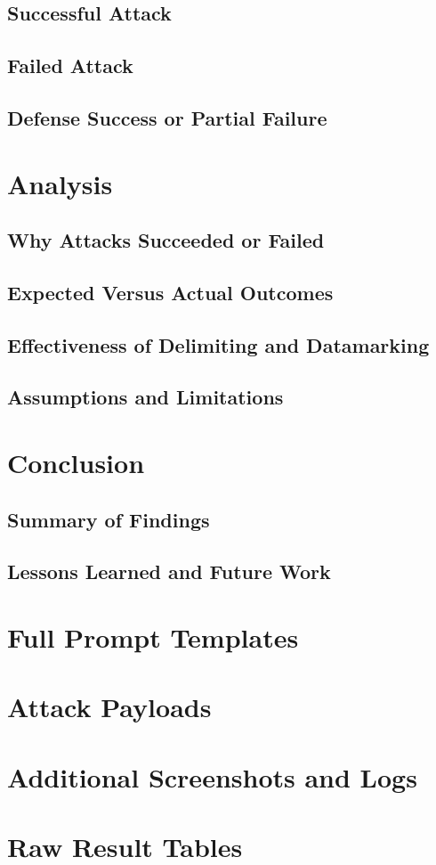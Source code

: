 \documentclass[11pt]{article}
\begin{document}
\subsection{Successful Attack}
\subsection{Failed Attack}
\subsection{Defense Success or Partial Failure}

\section{Analysis}
\subsection{Why Attacks Succeeded or Failed}
\subsection{Expected Versus Actual Outcomes}
\subsection{Effectiveness of Delimiting and Datamarking}
\subsection{Assumptions and Limitations}

\section{Conclusion}
\subsection{Summary of Findings}
\subsection{Lessons Learned and Future Work}

\appendix
\section{Full Prompt Templates}
\section{Attack Payloads}
\section{Additional Screenshots and Logs}
\section{Raw Result Tables}
\end{document}
